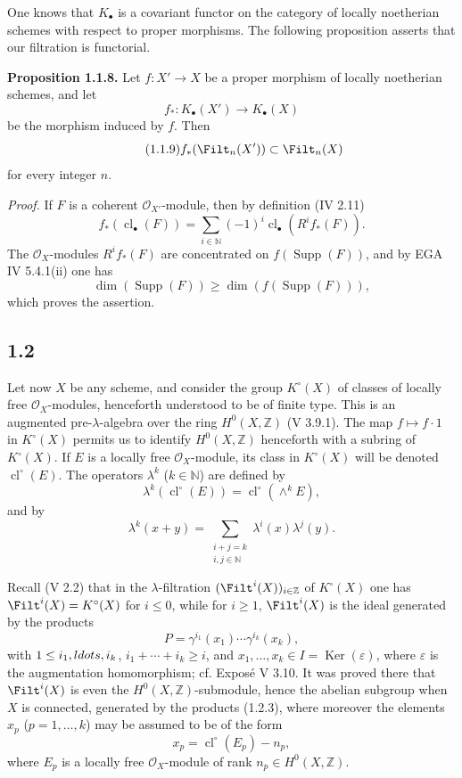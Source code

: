 \documentclass[11pt]{article}
\newcommand{\cl}{\operatorname{cl}}
\providecommand{\Ker}{\operatorname{Ker}}
\providecommand{\Supp}{\operatorname{Supp}}
\begin{document}
One knows that $K_\bullet$ is a covariant functor on the category of locally noetherian schemes with respect to proper morphisms. The following proposition asserts that our filtration is functorial.

\textbf{Proposition 1.1.8.} Let $f:X'\to X$ be a proper morphism of locally noetherian schemes, and let
\[
 f_*:K_\bullet(X')\longrightarrow K_\bullet(X)
\]
be the morphism induced by $f$. Then
\begin{equation}\tag{1.1.9}
 f_*(\Filt_n(X'))\subset \Filt_n(X)
\end{equation}
for every integer $n$.

\emph{Proof.} If $F$ is a coherent $\mathcal O_{X'}$-module, then by definition (IV 2.11)
\[
 f_*(\cl_\bullet(F))=\sum_{i\in\mathbb N}(-1)^i\cl_\bullet(R^if_*(F)).
\]
The $\mathcal O_X$-modules $R^if_*(F)$ are concentrated on $f(\Supp(F))$, and by EGA IV 5.4.1(ii) one has
\[
 \dim(\Supp(F))\geq \dim(f(\Supp(F))),
\]
which proves the assertion.

\subsection*{1.2}
Let now $X$ be any scheme, and consider the group $K^\circ(X)$ of classes of locally free $\mathcal O_X$-modules, henceforth understood to be of finite type. This is an augmented pre-$\lambda$-algebra over the ring $H^0(X,\mathbb Z)$ (V 3.9.1). The map $f\mapsto f\cdot 1$ in $K^\circ(X)$ permits us to identify $H^0(X,\mathbb Z)$ henceforth with a subring of $K^\circ(X)$. If $E$ is a locally free $\mathcal O_X$-module, its class in $K^\circ(X)$ will be denoted $\cl^\circ(E)$. The operators $\lambda^k$ ($k\in\mathbb N$) are defined by
\begin{equation}\tag{1.2.1}
 \lambda^k(\cl^\circ(E))=\cl^\circ(\wedge^k E),
\end{equation}
and by
\begin{equation}\tag{1.2.2}
 \lambda^k(x+y)=\sum_{\substack{i+j=k\\ i,j\in\mathbb N}}\lambda^i(x)\lambda^j(y).
\end{equation}

Recall (V 2.2) that in the $\lambda$-filtration $(\Filt^i(X))_{i\in\mathbb Z}$ of $K^\circ(X)$ one has $\Filt^i(X)=K^\circ(X)$ for $i\leq0$, while for $i\geq1$, $\Filt^i(X)$ is the ideal generated by the products
\begin{equation}\tag{1.2.3}
 P=\gamma^{i_1}(x_1)\cdots\gamma^{i_k}(x_k),
\end{equation}
with $1\leq i_1,\\ldots,i_k$, $i_1+\cdots+i_k\geq i$, and $x_1,\ldots,x_k\in I=\Ker(\varepsilon)$, where $\varepsilon$ is the augmentation homomorphism; cf. Exposé V 3.10. It was proved there that $\Filt^i(X)$ is even the $H^0(X,\mathbb Z)$-submodule, hence the abelian subgroup when $X$ is connected, generated by the products (1.2.3), where moreover the elements $x_p$ ($p=1,\ldots,k$) may be assumed to be of the form
\begin{equation}\tag{1.2.4}
 x_p=\cl^\circ(E_p)-n_p,
\end{equation}
where $E_p$ is a locally free $\mathcal O_X$-module of rank $n_p\in H^0(X,\mathbb Z)$.
\end{document}
